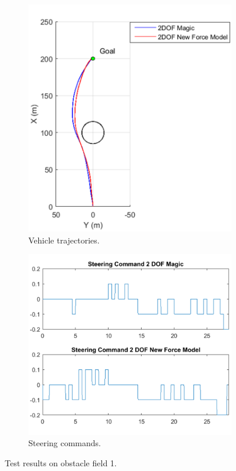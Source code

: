 \documentclass[12pt,onecolumn]{report}
\begin{document}
\begin{figure}
	\centering
	\begin{subfigure}[b]{0.49\columnwidth}
		\centering
		\includegraphics[height=\columnwidth]{Figs/Field1MagicvBekkerTrajectories_cropped.png}
		\caption{{\small Vehicle trajectories.}}   
		\label{fig:ObstacleField1TrajectoriesExp2}
	\end{subfigure}
	\hfill
	\begin{subfigure}[b]{0.49\columnwidth}
		\centering
		\includegraphics[width=\columnwidth]{Figs/Field1MagicvBekkerSteeringCommands_cropped.png}
		\caption{\small Steering commands.}   
		\label{fig:SteeringCommandsField1Exp2}
	\end{subfigure}
	\caption{\small Test results on obstacle field 1.}
	\label{fig:Obst1TestDataExp2}
\end{figure}
\end{document}
